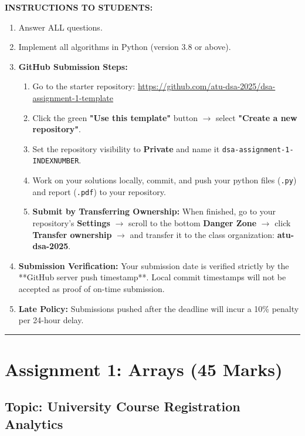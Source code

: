 \documentclass[11pt,a4paper]{article}
\begin{document}
\noindent
\textbf{INSTRUCTIONS TO STUDENTS:} \\
\begin{enumerate}
    \item Answer ALL questions.
    \item Implement all algorithms in Python (version 3.8 or above).
    \item \textbf{GitHub Submission Steps:}
    \begin{enumerate}
        \item Go to the starter repository: \url{https://github.com/atu-dsa-2025/dsa-assignment-1-template}
        \item Click the green \textbf{"Use this template"} button $\rightarrow$ select \textbf{"Create a new repository"}.
        \item Set the repository visibility to \textbf{Private} and name it \texttt{dsa-assignment-1-INDEXNUMBER}.
        \item Work on your solutions locally, commit, and push your python files (\texttt{.py}) and report (\texttt{.pdf}) to your repository.
        \item \textbf{Submit by Transferring Ownership:} When finished, go to your repository's \textbf{Settings} $\rightarrow$ scroll to the bottom \textbf{Danger Zone} $\rightarrow$ click \textbf{Transfer ownership} $\rightarrow$ and transfer it to the class organization: \textbf{atu-dsa-2025}.
    \end{enumerate}
    \item \textbf{Submission Verification:} Your submission date is verified strictly by the **GitHub server push timestamp**. Local commit timestamps will not be accepted as proof of on-time submission.
    \item \textbf{Late Policy:} Submissions pushed after the deadline will incur a 10\% penalty per 24-hour delay.
\end{enumerate}

\vspace{0.3cm}
\hrule
\vspace{0.5cm}

\section{Assignment 1: Arrays (45 Marks)}
\subsection*{Topic: University Course Registration Analytics}
\end{document}
